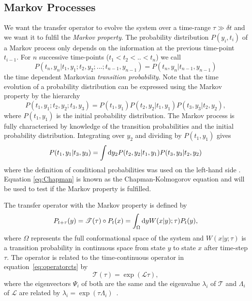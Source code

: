 \subsection{Markov Processes} 
\label{sec:MarkovProp}
We want the transfer operator to evolve the system over a time-range $\tau \gg \delta t$ and we want it to fulfil the \textit{Markov property}. The probability distribution $P(y_i,t_i)$ of a Markov process only depends on the information at the previous time-point $t_{i-1}$. For $n$ successive time-points ($t_1 < t_2 < .. < t_n $) we call
\begin{equation}
 P(t_n, y_n | t_1, y_1 ; t_2, y_2 ; ... ; t_{n-1} , y_{n-1} )=  P(t_n, y_n | t_{n-1} , y_{n-1} )
 \label{eq:transition}
\end{equation}
the time dependent Markovian \textit{transition probability}. Note that the time evolution of a probability distribution can be expressed using the Markov property by the hierarchy
\begin{equation}
 P(t_1, y_1 ; t_2, y_2 ; t_3, y_3 )= P(t_1,y_1) P(t_2, y_2 | t_1 , y_1 ) P(t_3, y_3 | t_2 , y_2 ) ,
 \label{eq:hierarchy}
\end{equation}
where $P(t_1, y_1)$ is the initial probability distribution. The Markov process is fully characterised by knowledge of the transition probabilities and the initial probability distribution.  Integrating over $y_2$ and dividing by $P(t_1,y_1)$ gives
\begin{equation}
 P(t_1, y_1 | t_3, y_3 ) = \int \mathop{}\!\mathrm{d} y_2 P(t_2, y_2 | t_1 , y_1 ) P(t_3, y_3 | t_2 , y_2 )
 \label{eq:Chapman}
\end{equation}
where the definition of conditional probabilities was used on the left-hand side \cite{van1992stochastic}. Equation \ref{eq:Chapman} is known as the Chapman-Kolmogorov equation and will be used to test if the Markov property is fulfilled.

The transfer operator with the Markov property is defined by
\begin{equation}
 P_{t+\tau}(y) = \mathscr{T}(\tau) \circ  P_t(x) = \int_\Omega \mathop{}\!\mathrm{d} y  W(x|y);\tau)   P_t(y),
\end{equation}
where $\Omega$ represents the full conformational space of the system and $W(x|y;\tau)$ is a transition probability in continuous space from state $y$ to state $x$ after time-step $\tau$.  The operator is related to the time-continuous operator in equation~\ref{eq:operatorcts} by
\begin{equation}
 \mathscr{T}(\tau) = \exp \left ( \mathscr{L} \tau \right ),
\end{equation}
where the eigenvectors $\Psi_i$ of both are the same and the eigenvalue $\lambda_i$ of $\mathscr{T}$ and $\Lambda_i$ of 
$\mathscr{L}$ are related by $\lambda_i = \exp (\tau \Lambda_i)$~\cite{bowman2013introduction}. 

